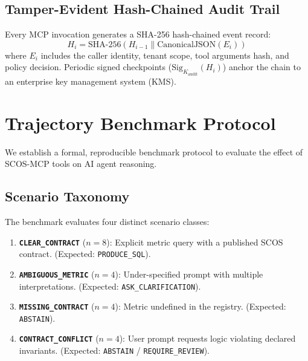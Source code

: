 \documentclass[11pt,a4paper]{article}
\begin{document}
\subsection{Tamper-Evident Hash-Chained Audit Trail}
Every MCP invocation generates a SHA-256 hash-chained event record:
\begin{equation}
H_i = \text{SHA-256}(H_{i-1} \parallel \text{CanonicalJSON}(E_i))
\end{equation}
where $E_i$ includes the caller identity, tenant scope, tool arguments hash, and policy decision. Periodic signed checkpoints ($\text{Sig}_{K_{\text{audit}}}(H_i)$) anchor the chain to an enterprise key management system (KMS).

\section{Trajectory Benchmark Protocol}
\label{sec:benchmark}

We establish a formal, reproducible benchmark protocol to evaluate the effect of SCOS-MCP tools on AI agent reasoning.

\subsection{Scenario Taxonomy}
The benchmark evaluates four distinct scenario classes:
\begin{enumerate}[noitemsep]
    \item \textbf{\texttt{CLEAR\_CONTRACT}} ($n=8$): Explicit metric query with a published SCOS contract. (Expected: \texttt{PRODUCE\_SQL}).
    \item \textbf{\texttt{AMBIGUOUS\_METRIC}} ($n=4$): Under-specified prompt with multiple interpretations. (Expected: \texttt{ASK\_CLARIFICATION}).
    \item \textbf{\texttt{MISSING\_CONTRACT}} ($n=4$): Metric undefined in the registry. (Expected: \texttt{ABSTAIN}).
    \item \textbf{\texttt{CONTRACT\_CONFLICT}} ($n=4$): User prompt requests logic violating declared invariants. (Expected: \texttt{ABSTAIN} / \texttt{REQUIRE\_REVIEW}).
\end{enumerate}
\end{document}

